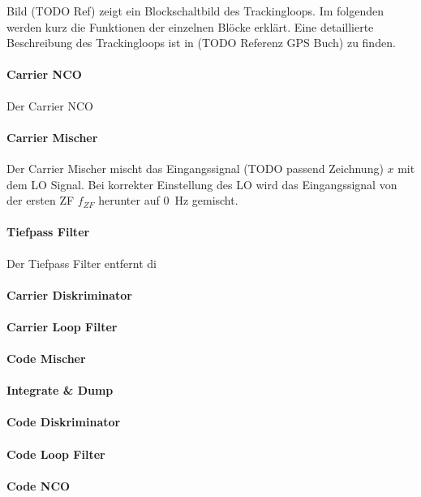 Bild (TODO Ref) zeigt ein Blockschaltbild des Trackingloops. Im folgenden werden kurz die Funktionen der einzelnen Blöcke erklärt. Eine detaillierte Beschreibung des Trackingloops ist in (TODO Referenz GPS Buch) zu finden.

\paragraph{Carrier NCO} Der Carrier \gls{NCO} 

\paragraph{Carrier Mischer} Der Carrier Mischer mischt das Eingangssignal (TODO passend Zeichnung) $x$ mit dem LO Signal. Bei korrekter Einstellung des LO wird das Eingangssignal von der ersten ZF $f_{ZF}$ herunter auf \SI{0}{\Hz} gemischt.

\paragraph{Tiefpass Filter} Der Tiefpass Filter entfernt di

\paragraph{Carrier Diskriminator}

\paragraph{Carrier Loop Filter}


\paragraph{Code Mischer}
\paragraph{Integrate \& Dump}
\paragraph{Code Diskriminator}
\paragraph{Code Loop Filter}
\paragraph{Code NCO}


